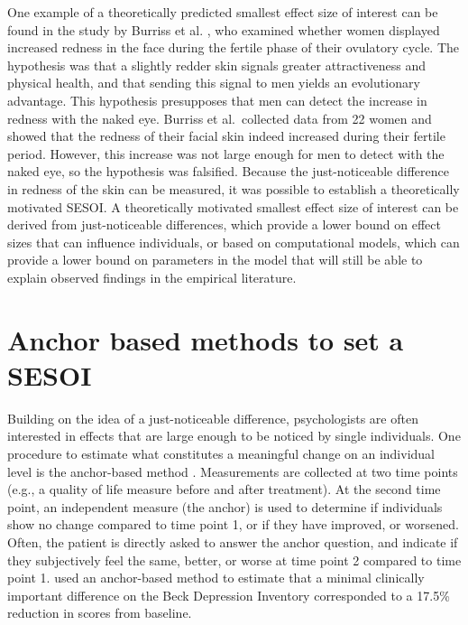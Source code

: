 \documentclass[
  oneside]{krantz}
\begin{document}
One example of a theoretically predicted smallest effect size of interest can be found in the study by Burriss et al. \citeyearpar{burriss_changes_2015}, who examined whether women displayed increased redness in the face during the fertile phase of their ovulatory cycle. The hypothesis was that a slightly redder skin signals greater attractiveness and physical health, and that sending this signal to men yields an evolutionary advantage. This hypothesis presupposes that men can detect the increase in redness with the naked eye. Burriss et al.~collected data from 22 women and showed that the redness of their facial skin indeed increased during their fertile period. However, this increase was not large enough for men to detect with the naked eye, so the hypothesis was falsified. Because the just-noticeable difference in redness of the skin can be measured, it was possible to establish a theoretically motivated SESOI. A theoretically motivated smallest effect size of interest can be derived from just-noticeable differences, which provide a lower bound on effect sizes that can influence individuals, or based on computational models, which can provide a lower bound on parameters in the model that will still be able to explain observed findings in the empirical literature.

\hypertarget{anchor-based-methods-to-set-a-sesoi}{%
\section{Anchor based methods to set a SESOI}\label{anchor-based-methods-to-set-a-sesoi}}

Building on the idea of a just-noticeable difference, psychologists are often interested in effects that are large enough to be noticed by single individuals. One procedure to estimate what constitutes a meaningful change on an individual level is the anchor-based method \citep{jaeschke_measurement_1989, norman_truly_2004, king_point_2011}. Measurements are collected at two time points (e.g., a quality of life measure before and after treatment). At the second time point, an independent measure (the anchor) is used to determine if individuals show no change compared to time point 1, or if they have improved, or worsened. Often, the patient is directly asked to answer the anchor question, and indicate if they subjectively feel the same, better, or worse at time point 2 compared to time point 1. \citet{button_minimal_2015} used an anchor-based method to estimate that a minimal clinically important difference on the Beck Depression Inventory corresponded to a 17.5\% reduction in scores from baseline.
\end{document}
